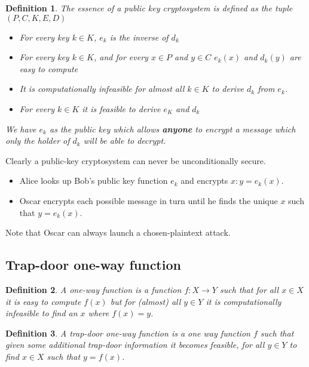 \documentclass{article}
\theoremstyle{quest}
\newtheorem*{definition}{Definition}
\begin{document}
\begin{definition}
    The essence of a \textit{public key cryptosystem} is defined as the tuple
    $(P,C,K,E,D)$
    \begin{itemize}
        \item For every key $k \in K$, $e_k$ is the inverse of $d_k$
        \item For every key $k \in K$,
            and for every $x \in P$ and $y \in C$
            $e_k(x)$ and $d_k(y)$ are easy to compute
        \item It is computationally infeasible for almost all $k \in K$
            to derive $d_k$ from $e_k$.
        \item For every $k \in K$ it is feasible to derive $e_K$ and $d_k$
    \end{itemize}
    We have $e_k$ as the public key which allows \textbf{anyone} to encrypt a message
    which only the holder of $d_k$ will be able to decrypt.
\end{definition}

Clearly a public-key cryptosystem can never be unconditionally secure.
\begin{itemize}
    \item Alice looks up Bob’s public key function $e_k$ and encrypts $x : y = e_k(x)$.
    \item Oscar encrypts each possible message in turn until he finds the unique $x$ such that $y = e_k(x)$.
\end{itemize}
Note that Oscar can always launch a chosen-plaintext attack.

\subsection{Trap-door one-way function}
\begin{definition}
    A \textit{one-way function} is a function $f : X \rightarrow Y$ such that 
    for all $x \in X$ it is easy to compute $f(x)$ but for (almost) all $y \in Y$ it is computationally
    infeasible to find an $x$ where $f(x) = y$.
\end{definition}
\begin{definition}
    A \textit{trap-door one-way function} is a one way function $f$ such that
    given some additional trap-door information it becomes feasible, 
    for all $y \in Y$ to find $x \in X$ such that $y = f(x)$.
\end{definition}
\end{document}
